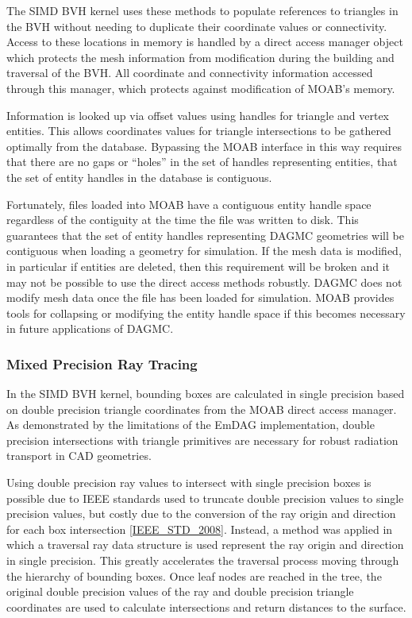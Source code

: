 The SIMD BVH kernel uses these methods to populate references to triangles in
the BVH without needing to duplicate their coordinate values or
connectivity. Access to these locations in memory is handled by a direct access
manager object which protects the mesh information from modification during the
building and traversal of the BVH. All coordinate and connectivity information
accessed through this manager, which protects against modification of MOAB's
memory.

Information is looked up via offset values using handles for triangle and vertex
entities. This allows coordinates values for triangle intersections to be
gathered optimally from the database. Bypassing the MOAB interface in this way
requires that there are no gaps or ``holes'' in the set of handles representing
entities, that the set of entity handles in the database is contiguous.

Fortunately, files loaded into MOAB have a contiguous entity handle space
regardless of the contiguity at the time the file was written to disk. This
guarantees that the set of entity handles representing DAGMC geometries will be
contiguous when loading a geometry for simulation. If the mesh data is modified,
in particular if entities are deleted, then this requirement will be broken and
it may not be possible to use the direct access methods robustly. DAGMC does not
modify mesh data once the file has been loaded for simulation. MOAB provides
tools for collapsing or modifying the entity handle space if this becomes
necessary in future applications of DAGMC.

\subsubsection{Mixed Precision Ray Tracing}

In the SIMD BVH kernel, bounding boxes are calculated in single precision based
on double precision triangle coordinates from the MOAB direct access manager. As
demonstrated by the limitations of the EmDAG implementation, double precision
intersections with triangle primitives are necessary for robust radiation
transport in CAD geometries.

Using double precision ray values to intersect with single precision boxes is
possible due to IEEE standards used to truncate double precision values to single
precision values, but costly due to the conversion of the ray origin and
direction for each box intersection \ref{IEEE_STD_2008}. Instead, a method was
applied in which a traversal ray data structure is used represent the ray origin
and direction in single precision. This greatly accelerates the traversal
process moving through the hierarchy of bounding boxes. Once leaf nodes are
reached in the tree, the original double precision values of the ray and double
precision triangle coordinates are used to calculate intersections and return
distances to the surface.

